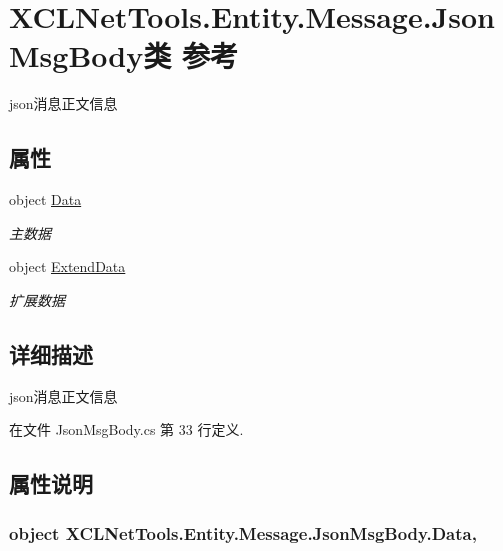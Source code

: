 \hypertarget{class_x_c_l_net_tools_1_1_entity_1_1_message_1_1_json_msg_body}{\section{X\-C\-L\-Net\-Tools.\-Entity.\-Message.\-Json\-Msg\-Body类 参考}
\label{class_x_c_l_net_tools_1_1_entity_1_1_message_1_1_json_msg_body}
}


json消息正文信息  


\subsection*{属性}
\begin{DoxyCompactItemize}
\item 
object \hyperlink{class_x_c_l_net_tools_1_1_entity_1_1_message_1_1_json_msg_body_a8bf6d68ba33b65eac5431b4d2873e719}{Data}
\begin{DoxyCompactList}\small\item\em 主数据 \end{DoxyCompactList}\item 
object \hyperlink{class_x_c_l_net_tools_1_1_entity_1_1_message_1_1_json_msg_body_a0382629d68979ea8a39383a1d9891ab7}{Extend\-Data}
\begin{DoxyCompactList}\small\item\em 扩展数据 \end{DoxyCompactList}\end{DoxyCompactItemize}


\subsection{详细描述}
json消息正文信息 



在文件 Json\-Msg\-Body.\-cs 第 33 行定义.



\subsection{属性说明}
\hypertarget{class_x_c_l_net_tools_1_1_entity_1_1_message_1_1_json_msg_body_a8bf6d68ba33b65eac5431b4d2873e719}{
\subsubsection[{Data}]{\setlength{\rightskip}{0pt plus 5cm}object X\-C\-L\-Net\-Tools.\-Entity.\-Message.\-Json\-Msg\-Body.\-Data\hspace{0.3cm}{\ttfamily [get]}, {\ttfamily [set]}}}\label{class_x_c_l_net_tools_1_1_entity_1_1_message_1_1_json_msg_body_a8bf6d68ba33b65eac5431b4d2873e719}


